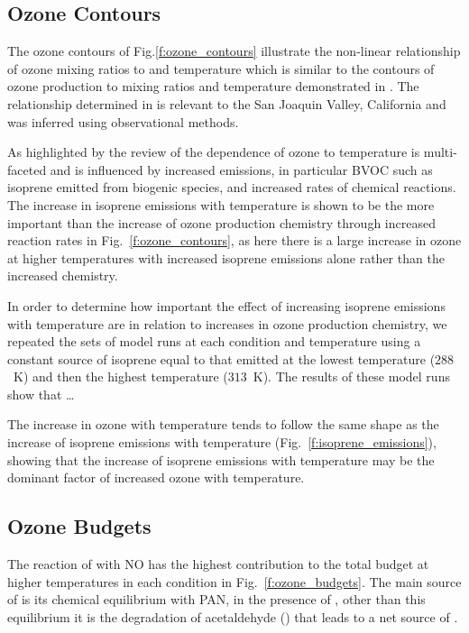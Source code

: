 \subsection{Ozone Contours} \label{d:ozone_contours}

The ozone contours of Fig.\ref{f:ozone_contours} illustrate the non-linear relationship of ozone mixing ratios to  and temperature which is similar to the contours of ozone production to  mixing ratios and temperature demonstrated in \citet{Pusede:2014}.
The relationship determined in \citet{Pusede:2014} is relevant to the San Joaquin Valley, California and was inferred using observational methods.

As highlighted by the review of \citet{Pusede:2015} the dependence of ozone to temperature is multi-faceted and is influenced by increased emissions, in particular BVOC such as isoprene emitted from biogenic species, and increased rates of chemical reactions.
The increase in isoprene emissions with temperature is shown to be the more important than the increase of ozone production chemistry through increased reaction rates in Fig.~\ref{f:ozone_contours}, as here there is a large increase in ozone at higher temperatures with increased isoprene emissions alone rather than the increased chemistry.

In order to determine how important the effect of increasing isoprene emissions with temperature are in relation to increases in ozone production chemistry, we repeated the sets of model runs at each  condition and temperature using a constant source of isoprene equal to that emitted at the lowest temperature ($288$~K) and then the highest temperature ($313$~K). 
The results of these model runs show that \ldots

The increase in ozone with temperature tends to follow the same shape as the increase of isoprene emissions with temperature (Fig.~\ref{f:isoprene_emissions}), showing that the increase of isoprene emissions with temperature may be the dominant factor of increased ozone with temperature.

\subsection{Ozone Budgets} \label{d:ozone_budgets}

The reaction of  with NO has the highest contribution to the total  budget at higher temperatures in each  condition in Fig.~\ref{f:ozone_budgets}.
The main source of  is its chemical equilibrium with PAN, in the presence of , other than this equilibrium it is the degradation of acetaldehyde () that leads to a net source of .


